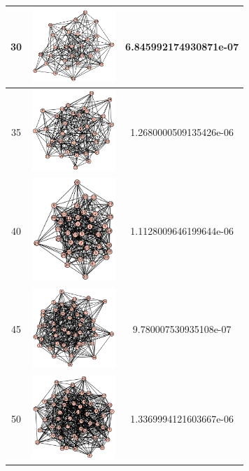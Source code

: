 \documentclass[a4paper, 12pt]{article}
\begin{document}
\begin{center}
\begin{longtable}{c|c|c}
        30 & \includegraphics[width=90pt]{D6} & 6.845992174930871e-07 \\ \hline
        35 & \includegraphics[width=90pt]{D7} & 1.2680000509135426e-06 \\ \hline
        40 & \includegraphics[width=90pt]{D8} & 1.1128009646199644e-06 \\ \hline
        45 & \includegraphics[width=90pt]{D9} & 9.780007530935108e-07 \\ \hline
        50 & \includegraphics[width=90pt]{D10} & 1.3369994121603667e-06 \\ \hline
    \end{longtable}
\end{center}
\end{document}
